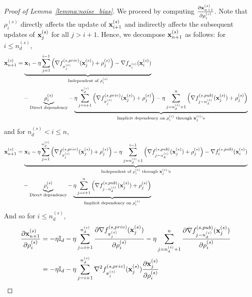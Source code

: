 \begin{proof}[Proof of Lemma~\ref{lemma:noise_bias}]
    We proceed by computing $\frac{\partial {\mathbf{x}}_{n+1}^{(s)}}{\partial \rho_i^{(s)}}$.
    Note that $\rho_i^{(s)}$ directly affects the update of ${\mathbf{x}}_{i+1}^{(s)}$ and indirectly affects the subsequent updates of ${\mathbf{x}}_{j}^{(s)}$ for all  $j > i + 1$. Hence, we decompose ${\mathbf{x}}_{n+1}^{(s)}$ as follows: for $i \leq n_d^{(s)}$,
    \begin{align}
        {\mathbf{x}}_{n+1}^{(s)} &= \underbrace{
            {\mathbf{x}}_1 - \eta \sum_{j=1}^{i-1}\Big( \nabla f_{\pi_j^{(s)}}^{(s, priv)}({\mathbf{x}}_j^{(s)}) + \rho_j^{(s)} \Big)
            - \nabla f_{\pi_i^{(s)}}({\mathbf{x}}_i^{(s)})
        }_{\text{Independent of $\rho_i^{(s)}$}}\\
        \nonumber
        &\quad - \underbrace{
            \rho_i^{(s)}
        }_{\text{Direct dependency}}
        - \underbrace{
            \eta \sum_{j=i+1}^{n_d^{(s)}}\Big( \nabla f_{\pi_j^{(s)}}^{(s, priv)}({\mathbf{x}}_j^{(s)}) + \rho_j^{(s)}\Big) - \eta \sum_{j=n_d^{(s)}+1}^{n}\Big(\nabla f_{j-n_d^{(s)}}^{(s, pub)}({\mathbf{x}}_j^{(s)}) + \rho_j^{(s)}
        \Big)
        }_{\text{Implicit dependency on $\rho_i^{(s)}$ through ${\mathbf{x}}_j^{(s)}$'s}}
    \end{align}
    and for $n_d^{(s)} < i \leq n$,
    \begin{align}
        {\mathbf{x}}_{n+1}^{(s)} 
        &= \underbrace{
            {\mathbf{x}}_1 - \eta \sum_{j=1}^{n_d^{(s)}} \Big(\nabla f_{\pi_j^{(s)}}^{(s, priv)}({\mathbf{x}}_j^{(s)}) + \rho_j^{(s)}\Big) - \eta \sum_{j=n_d^{(s)}+1}^{i-1}\Big(\nabla f_{j-n_d^{(s)}}^{(s, pub)}({\mathbf{x}}_j^{(s)}) + \rho_j^{(s)}\Big)
            - \nabla f_i^{(s, pub)}({\mathbf{x}}_i^{(s)})
        }_{\text{Independent of $\rho_i^{(s)}$ through ${\mathbf{x}}_j^{(s)}$'s}}\\
        \nonumber
        &\quad - \underbrace{\rho_i^{(s)}}_{\text{Direct dependency}}
        - \underbrace{
            \eta \sum_{j=i+1}^{n}\Big(\nabla f_{j-n_d^{(s)}}^{(s, pub)}({\mathbf{x}}_j^{(s)}) + \rho_j^{(s)}\Big)
        }_{\text{Implicit dependency on $\rho_i^{(s)}$}}
    \end{align}
    And so for $i\leq n_d^{(s)}$,
    \begin{align}
    \label{eq:partial_x_n1_small_i}
        \frac{\partial \rvx_{n+1}^{(s)}}{\partial \rho_i^{(s)}} 
        &= -\eta \sI_d - \eta \sum_{j=i+1}^{n_d^{(s)}} \frac{\partial \nabla f_{\pi_j^{(s)}}^{(s, priv)}(\rvx_j^{(s)})}{\partial \rho_i^{(s)}}
        - \eta \sum_{j=n_d^{(s)}+1}^{n} \frac{\partial \nabla f_{j-n_d^{(s)}}^{(s, pub)}(\rvx_j^{(s)})}{\partial \rho_i^{(s)}}\\
        &= -\eta \sI_d - \eta \sum_{j=i+1}^{n_d^{(s)}} \nabla^2 f_{\pi_j^{(s)}}^{(s,priv)}(\rvx_j^{(s)})\frac{\partial \rvx_j^{(s)}}{\partial \rho_i^{(s)}}

\end{align}
\end{proof}
